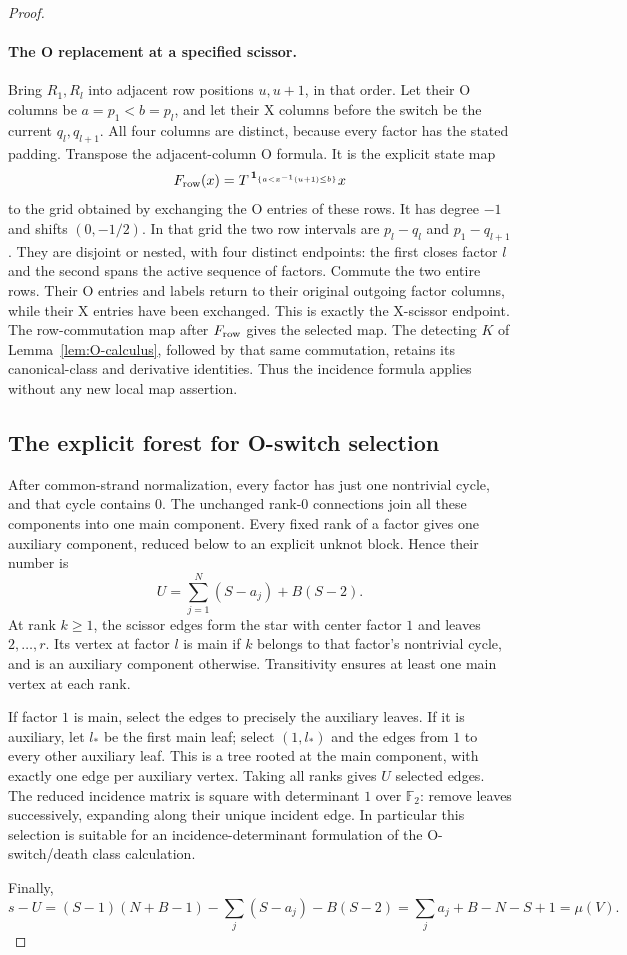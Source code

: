 \documentclass[11pt,a4paper]{article}
\theoremstyle{remark}
\begin{document}
\begin{proof}
\paragraph{The O replacement at a specified scissor.}
Bring $R_1,R_l$ into adjacent row positions $u,u+1$, in that order.
Let their O columns be $a=p_1<b=p_l$, and let their X columns before
the switch be the current $q_l,q_{l+1}$.  All four columns are
distinct, because every factor has the stated padding.  Transpose
the adjacent-column O formula.  It is the explicit state map
\[
 F_{\rm row}(x)=
 T^{\,\mathbf1_{\{a<x^{-1}(u+1)\le b\}}}x
\]
to the grid obtained by exchanging the O entries of these rows.
It has degree $-1$ and shifts $(0,-1/2)$.  In that grid the two
row intervals are $p_l\!-\!q_l$ and $p_1\!-\!q_{l+1}$.
They are disjoint or nested, with four distinct endpoints: the
first closes factor $l$ and the second spans the active sequence
of factors.  Commute the two entire rows.  Their O entries and
labels return to their original outgoing factor columns, while
their X entries have been exchanged.  This is exactly the X-scissor
endpoint.  The row-commutation map after $F_{\rm row}$ gives the
selected map.  The detecting $K$ of Lemma~\ref{lem:O-calculus},
followed by that same commutation, retains its canonical-class
and derivative identities.  Thus the incidence formula applies
without any new local map assertion.

\subsection{The explicit forest for O-switch selection}

After common-strand normalization, every factor has just one nontrivial
cycle, and that cycle contains $0$.  The unchanged rank-$0$ connections join
all these components into one main component.  Every fixed rank of a factor
gives one auxiliary component, reduced below to an explicit unknot block.  Hence their number is
\[
 U=\sum_{j=1}^N(S-a_j)+B(S-2).
\]
At rank $k\geq1$, the scissor edges form the star with center factor $1$ and
leaves $2,\ldots,r$.  Its vertex at factor $l$ is main if $k$ belongs to that
factor's nontrivial cycle, and is an auxiliary component otherwise.
Transitivity ensures at least one main vertex at each rank.

If factor $1$ is main, select the edges to precisely the auxiliary leaves.
If it is auxiliary, let $l_*$ be the first main leaf; select $(1,l_*)$ and
the edges from $1$ to every other auxiliary leaf.  This is a tree rooted at
the main component, with exactly one edge per auxiliary vertex.  Taking all
ranks gives $U$ selected edges.  The reduced incidence matrix is square with
determinant $1$ over $\mathbb F_2$: remove leaves successively, expanding
along their unique incident edge.  In particular this selection is suitable
for an incidence-determinant formulation of the O-switch/death class
calculation.

Finally,
\[
 s-U=(S-1)(N+B-1)-\sum_j(S-a_j)-B(S-2)
     =\sum_j a_j+B-N-S+1=\mu(V).
\]



\end{proof}
\end{document}
